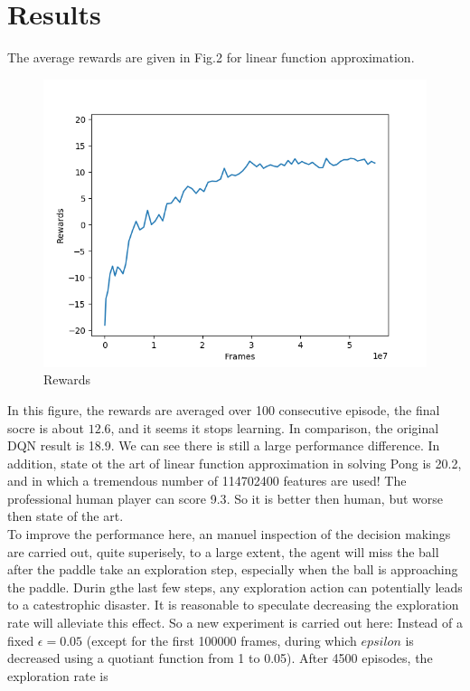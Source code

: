\documentclass[12pt]{article}
\begin{document}
\section{Results}
The average rewards are given in Fig.2 for linear function
approximation.
\begin{figure}[h]
    \centering
    \includegraphics [scale=0.5]{rewards.png}
    \caption {Rewards}
\end{figure}
In this figure, the rewards are averaged over 100 consecutive episode,
the final socre is about $12.6$, and it seems it stops learning.
In comparison, the original DQN result is 18.9. We can see there is
still a large performance difference. In addition, state ot the art of
linear function approximation in solving Pong is 20.2\cite{16liang},
and in which a tremendous number of 114702400 features are used! The
professional human player can score 9.3\cite{15atari}. So it is better
then human, but worse then state of the art.\\
To improve the performance here, an manuel inspection of the decision
makings are carried out, quite superisely, to a large extent, the
agent will miss the ball after the paddle take an exploration step,
especially when the ball is approaching the paddle. Durin gthe last
few steps, any exploration action can potentially leads to a
catestrophic disaster. It is reasonable to speculate decreasing the
exploration rate will alleviate this effect. So a new experiment is
carried out here: Instead of a fixed $\epsilon=0.05$ (except for the 
first 100000 frames, during which $epsilon$ is decreased using a quotiant
function from 1 to 0.05). After 4500 episodes, the exploration rate is
\end{document}
